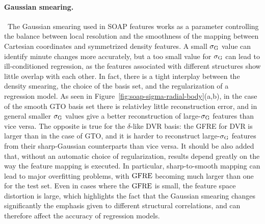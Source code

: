 \paragraph*{Gaussian smearing.}\,
The Gaussian smearing used in SOAP features works as a parameter controlling the balance between local resolution and the smoothness of the mapping between Cartesian coordinates and symmetrized density features. A small $\sigma_\text{G}$ value can identify minute changes more accurately, but a too small value for $\sigma_\text{G}$ can lead to ill-conditioned regression, as the features associated with different structures show little overlap with each other.
In fact, there is a tight interplay between the density smearing, the choice of the basis set, and the regularization of a regression model. 
As seen in Figure~\ref{fig:soap-sigma-radial-body}(a,b), in the case of the smooth GTO basis set there is relativley little reconstruction error, and in general smaller $\sigma_\text{G}$ values give a better reconstruction of large-$\sigma_\text{G}$ features than vice versa. The opposite is true for the $\delta$-like DVR basis: the GFRE for DVR is larger than in the case of GTO, and it is harder to reconstruct large-$\sigma_\text{G}$ features from their sharp-Gaussian counterparts than vice versa. It should be also added that, without an automatic choice of regularization, results depend greatly on the way the feature mapping is executed. In particular, sharp-to-smooth mapping can lead to major overfitting problems, with $\operatorname{GFRE}$ becoming much larger than one for the test set.  
Even in cases where the $\operatorname{GFRE}$ is small, the feature space distortion is large, which highlights the fact that the Gaussian smearing changes significantly the emphasis given to different structural correlations, and can therefore affect the accuracy of regression models. 

